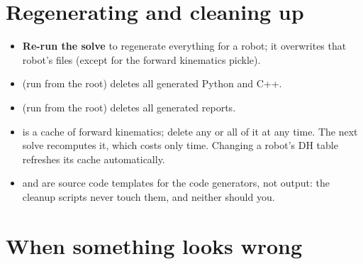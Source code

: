 \documentclass[11pt]{article}
\begin{document}
\section{Regenerating and cleaning up}

\begin{itemize}
\item \textbf{Re-run the solve} to regenerate everything for a robot;  it
  overwrites that robot's files (except for the forward kinematics pickle).
\item \textbf{} (run from the root) deletes all
  generated Python and C++.
\item \textbf{} (run from the root) deletes all
  generated reports.
\item \textbf{} is a cache of forward kinematics;  delete any or
  all of it at any time.  The next solve recomputes it, which costs only time.
  Changing a robot's DH table refreshes its cache automatically.
\item {} and  are source code templates for the
code generators, not output:  the cleanup
  scripts never touch them, and neither should you.
\end{itemize}

\section{When something looks wrong}\label{sec:wrong}
\end{document}

